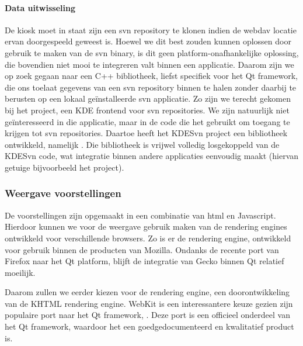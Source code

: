 \documentclass[verslag.tex]{subfiles}
\begin{document}
\paragraph{Data uitwisseling} De kiosk moet in staat zijn een \ac{svn} repository te klonen indien de \ac{webdav} locatie ervan doorgespeeld geweest is. Hoewel we dit best zouden kunnen oplossen door gebruik te maken van de \ac{svn} binary, is dit geen platform-onafhankelijke oplossing, die bovendien niet mooi te integreren valt binnen een applicatie. Daarom zijn we op zoek gegaan naar een C++ bibliotheek, liefst specifiek voor het Qt framework, die ons toelaat gegevens van een \ac{svn} repository binnen te halen zonder daarbij te berusten op een lokaal geïnstalleerde \ac{svn} applicatie. Zo zijn we terecht gekomen bij het  project, een KDE frontend voor \ac{svn} repositories. We zijn natuurlijk niet geïnteresseerd in die applicatie, maar in de code die het gebruikt om toegang te krijgen tot \ac{svn} repositories. Daartoe heeft het KDESvn project een bibliotheek ontwikkeld, namelijk . Die bibliotheek is vrijwel volledig losgekoppeld van de KDESvn code, wat integratie binnen andere applicaties eenvoudig maakt (hiervan getuige bijvoorbeeld het  project).

\subsubsection{Weergave voorstellingen}

De voorstellingen zijn opgemaakt in een combinatie van \ac{html} en Javascript. Hierdoor kunnen we voor de weergave gebruik maken van de rendering engines ontwikkeld voor verschillende browsers. Zo is er de  rendering engine, ontwikkeld voor gebruik binnen de producten van Mozilla. Ondanks de recente port van Firefox naar het Qt platform, blijft de integratie van Gecko binnen Qt relatief moeilijk.

Daarom zullen we eerder kiezen voor de  rendering engine, een doorontwikkeling van de KHTML rendering engine. WebKit is een interessantere keuze gezien zijn populaire port naar het Qt framework, . Deze port is een officieel onderdeel van het Qt framework, waardoor het een goedgedocumenteerd en kwalitatief product is.
\end{document}
